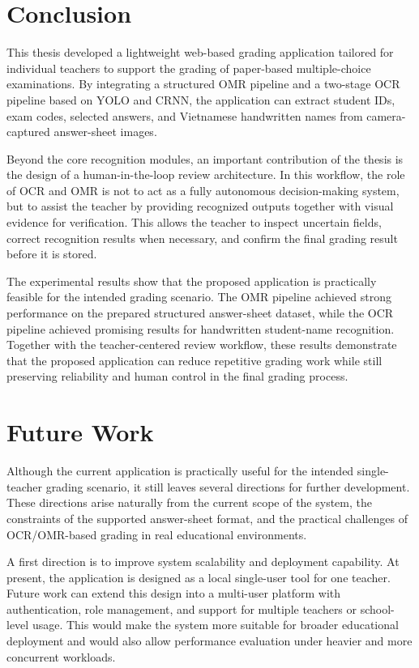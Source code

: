 \documentclass[../Main.tex]{subfiles}
\begin{document}
\section{Conclusion}
\label{section:6.1}

This thesis developed a lightweight web-based grading application tailored for
individual teachers to support the grading of paper-based multiple-choice
examinations. By integrating a structured OMR pipeline and a two-stage OCR
pipeline based on YOLO and CRNN, the application can extract student IDs, exam
codes, selected answers, and Vietnamese handwritten names from camera-captured
answer-sheet images.

Beyond the core recognition modules, an important contribution of the thesis is
the design of a human-in-the-loop review architecture. In this workflow, the
role of OCR and OMR is not to act as a fully autonomous decision-making system,
but to assist the teacher by providing recognized outputs together with visual
evidence for verification. This allows the teacher to inspect uncertain fields,
correct recognition results when necessary, and confirm the final grading result
before it is stored.

The experimental results show that the proposed application is practically
feasible for the intended grading scenario. The OMR pipeline achieved strong
performance on the prepared structured answer-sheet dataset, while the OCR
pipeline achieved promising results for handwritten student-name recognition.
Together with the teacher-centered review workflow, these results demonstrate
that the proposed application can reduce repetitive grading work while still
preserving reliability and human control in the final grading process.

\section{Future Work}
\label{section:6.2}

Although the current application is practically useful for the intended
single-teacher grading scenario, it still leaves several directions for further
development. These directions arise naturally from the current scope of the
system, the constraints of the supported answer-sheet format, and the practical
challenges of OCR/OMR-based grading in real educational environments.

A first direction is to improve system scalability and deployment capability.
At present, the application is designed as a local single-user tool for one
teacher. Future work can extend this design into a multi-user platform with
authentication, role management, and support for multiple teachers or
school-level usage. This would make the system more suitable for broader
educational deployment and would also allow performance evaluation under
heavier and more concurrent workloads.
\end{document}
